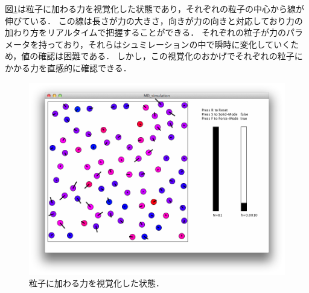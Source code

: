 \newpage

図\ref{fig:force}は粒子に加わる力を視覚化した状態であり，それぞれの粒子の中心から線が伸びている．
この線は長さが力の大きさ，向きが力の向きと対応しており力の加わり方をリアルタイムで把握することができる．
それぞれの粒子が力のパラメータを持っており，それらはシュミレーションの中で瞬時に変化していくため，値の確認は困難である．
しかし，この視覚化のおかげでそれぞれの粒子にかかる力を直感的に確認できる．

\begin{figure}[htbp]
 \begin{center}
  \includegraphics[width=150mm]{../implement/force_mode.png}
 \end{center}
 \caption{粒子に加わる力を視覚化した状態．}
 \label{fig:force}
\end{figure}
